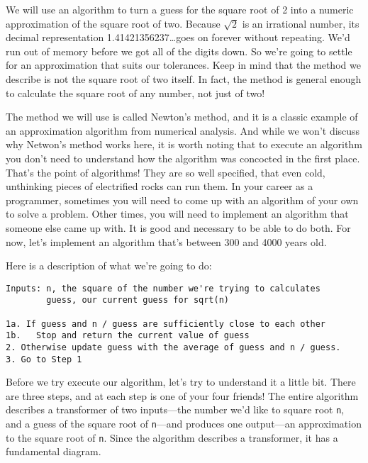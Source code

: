 We will use an algorithm to turn a guess for the square root of 2 into a numeric approximation of the square root of two. Because $\sqrt{2}$ is an irrational number, its decimal representation 1.41421356237\dots goes on forever without repeating. We'd run out of memory before we got all of the digits down. So we're going to settle for an approximation that suits our tolerances. Keep in mind that the method we describe is not the square root of two itself. In fact, the method is general enough to calculate the square root of any number, not just of two!

The method we will use is called Newton's method, and it is a classic example of an approximation algorithm from numerical analysis. And while we won't discuss why Netwon's method works here, it is worth noting that to execute an algorithm you don't need to understand how the algorithm was concocted in the first place. That's the point of algorithms! They are so well specified, that even cold, unthinking pieces of electrified rocks can run them. In your career as a programmer, sometimes you will need to come up with an algorithm of your own to solve a problem. Other times, you will need to implement an algorithm that someone else came up with. It is good and necessary to be able to do both. For now, let's implement an algorithm that's between 300 and 4000 years old.

Here is a description of what we're going to do:

\begin{lstlisting}[caption={Newton's method for calculating square roots}]
Inputs: n, the square of the number we're trying to calculates
        guess, our current guess for sqrt(n)

1a. If guess and n / guess are sufficiently close to each other
1b.   Stop and return the current value of guess
2. Otherwise update guess with the average of guess and n / guess.
3. Go to Step 1
\end{lstlisting}

Before we try execute our algorithm, let's try to understand it a little bit. There are three steps, and at each step is one of your four friends! The entire algorithm describes a transformer of two inputs---the number we'd like to square root \texttt{n}, and a guess of the square root of \texttt{n}---and produces one output---an approximation to the square root of \texttt{n}. Since the algorithm describes a transformer, it has a fundamental diagram.

